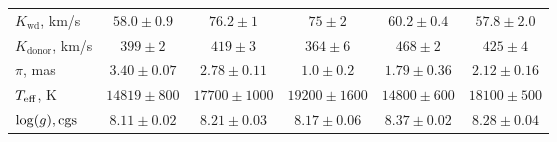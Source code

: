 \begin{landscape}
\begin{table*}
\begin{tabular}{lccccc}
            $K_\mathrm{wd}$, km/s      & $58.0\pm0.9$            & $76.2\pm1$               & $75\pm2$                  & $60.2\pm0.4$              & $57.8\pm2.0$ \\
            $K_\mathrm{donor}$, km/s   & $399\pm2$               & $419\pm3$                & $364\pm6$                 & $468\pm2$                 & $425\pm4$ \\
            \hline
            $\pi$, mas                 & $3.40\pm0.07$           & $2.78\pm0.11$            & $1.0\pm0.2$               & $1.79\pm0.36$             & $2.12\pm0.16$ \\
            $T_{\rm eff}$, K           & $14819\pm800$           & $17700\pm1000$           & $19200\pm1600$            & $14800\pm600$             & $18100\pm500$ \\
            $\log(g), {\rm cgs}$       & $8.11\pm0.02$           & $8.21\pm0.03$            & $8.17\pm0.06$             & $8.37\pm0.02$             & $8.28\pm0.04$ \\
            \hline
            \hline
        \end{tabular}
    \end{table*}


\end{landscape}
